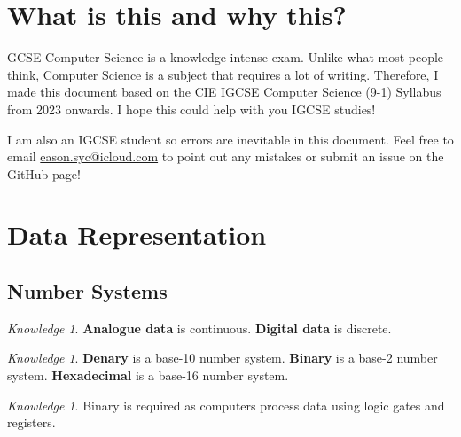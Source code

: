 \documentclass[8pt]{article}
\author{\Author}
\title{\Title}
\date{Version 1. \Date}
\theoremstyle{remark}
\newtheorem{knowledge}[method]{Knowledge}
\begin{document}
	\maketitle

	\tableofcontents

    \section*{What is this and why this?}
    
        GCSE Computer Science is a knowledge-intense exam. Unlike what most people think, Computer Science is a subject that requires a lot of writing. Therefore, I made this document based on the CIE IGCSE Computer Science (9-1) Syllabus from 2023 onwards. I hope this could help with you IGCSE studies!

        I am also an IGCSE student so errors are inevitable in this document. Feel free to email \href{eason.syc@icloud.com}{eason.syc@icloud.com} to point out any mistakes or submit an issue on the GitHub page!
        
    \section{Data Representation}
        \subsection{Number Systems}

        \begin{knowledge}
            \textbf{Analogue data} is continuous. \textbf{Digital data} is discrete.
        \end{knowledge}

        \begin{knowledge}
            \textbf{Denary} is a base-10 number system. \textbf{Binary} is a base-2 number system. \textbf{Hexadecimal} is a base-16 number system.
        \end{knowledge}

        \begin{knowledge}
            Binary is required as computers process data using logic gates and registers.
        \end{knowledge}
\end{document}
